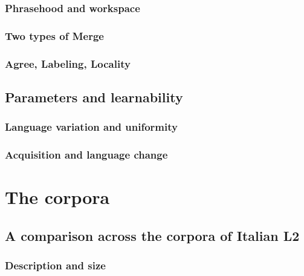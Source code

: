 \documentclass[
  a4paper,
  twoside,
  12pt,
  chapterprefix=false,
  bibliography=totocnumbered,
  listof=flat]{scrbook}
\begin{document}
\hypertarget{phrasehood-and-workspace}{%
\subsection{Phrasehood and workspace}\label{phrasehood-and-workspace}}

\hypertarget{two-types-of-merge}{%
\subsection{Two types of Merge}\label{two-types-of-merge}}

\hypertarget{agree-labeling-locality}{%
\subsection{Agree, Labeling, Locality}\label{agree-labeling-locality}}

\hypertarget{parameters-and-learnability}{%
\section{Parameters and learnability}\label{parameters-and-learnability}}

\hypertarget{language-variation-and-uniformity}{%
\subsection{Language variation and uniformity}\label{language-variation-and-uniformity}}

\hypertarget{acquisition-and-language-change}{%
\subsection{Acquisition and language change}\label{acquisition-and-language-change}}

\hypertarget{the-corpora}{%
\chapter{The corpora}\label{the-corpora}}

\hypertarget{a-comparison-across-the-corpora-of-italian-l2}{%
\section{A comparison across the corpora of Italian L2}\label{a-comparison-across-the-corpora-of-italian-l2}}

\hypertarget{description-and-size}{%
\subsection{Description and size}\label{description-and-size}}
\end{document}
